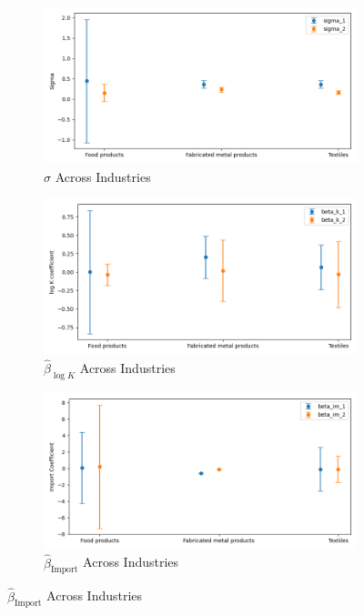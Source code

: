 \documentclass{article}
\begin{document}
\begin{figure}[ht!]
    \begin{subfigure}[t]{0.32\textwidth}
        \centering
        \includegraphics[width=\textwidth]{figure/stationary_mixture_kmshare_ciiu_sigma_across_industries.png}
        \caption{$\hat\sigma$ Across Industries}
    \end{subfigure}
    \begin{subfigure}[t]{0.32\textwidth}
        \centering
        \includegraphics[width=\textwidth]{figure/stationary_mixture_kmshare_ciiu_beta_k_across_industries.png}
        \caption{$\hat{\beta}_{\log K}$ Across Industries}
    \end{subfigure}
    \begin{subfigure}[t]{0.32\textwidth}
        \centering
        \includegraphics[width=\textwidth]{figure/stationary_mixture_kmshare_ciiu_beta_im_across_industries.png}
        \caption{$\hat{\beta}_{\text{Import}}$ Across Industries}
    \end{subfigure}
\end{figure}
\end{document}
